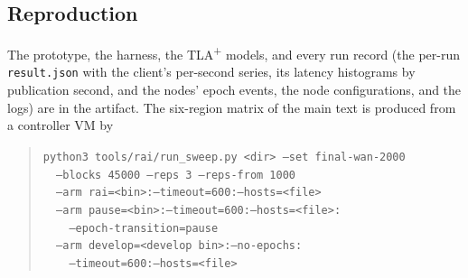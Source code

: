 \documentclass[conference]{IEEEtran}
\begin{document}
\subsection{Reproduction}
The prototype, the harness, the TLA\textsuperscript{+} models, and every run record (the per-run \texttt{result.json} with the client's per-second series, its latency histograms by publication second, and the nodes' epoch events, the node configurations, and the logs) are in the artifact. The six-region matrix of the main text is produced from a controller VM by
\begin{quote}\small\texttt{python3 tools/rai/run\_sweep.py <dir> --set final-wan-2000\\
\ \ --blocks 45000 --reps 3 --reps-from 1000\\
\ \ --arm rai=<bin>:--timeout=600:--hosts=<file>\\
\ \ --arm pause=<bin>:--timeout=600:--hosts=<file>:\\
\ \ \ \ --epoch-transition=pause\\
\ \ --arm develop=<develop bin>:--no-epochs:\\
\ \ \ \ --timeout=600:--hosts=<file>}
\end{quote}
\end{document}
